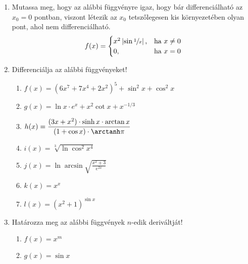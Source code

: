 \documentclass[a4paper, 12pt]{scrartcl}
\begin{document}
\begin{enumerate}
  \item Mutassa meg, hogy az alábbi függvényre igaz, hogy bár differenciálható
        az $x_0 = 0$ pontban, viszont létezik az $x_0$ tetszőlegesen kis
        környezetében olyan pont, ahol nem differenciálható.
        \[
          f(x) = \begin{cases}
            x^2 \left| \sin \sfrac1x \right|\text, & \text{ha } x \neq 0 \\
            0\text,                                & \text{ha } x = 0
          \end{cases}
        \]

  \item Differenciálja az alábbi függvényeket!
        \begin{enumerate}
          \item $\displaystyle
                  f(x) = (6x^7 + 7x^4 + 2x^2)^5 + \sin^2 x + \cos^2 x
                $

          \item $\displaystyle
                  g(x) = \ln x \cdot e^x + x^2 \cot x + x^{-1/3}
                $

          \item $\displaystyle
                  h(x) = \frac{
                    (3x + x^2) \cdot \sinh x \cdot \arctan x
                  }{
                    (1 + \cos x) \cdot \arctanh \pi
                  }
                $

          \item $\displaystyle
                  i(x) = \sqrt[3]{\ln \cos^2 x^4}
                $

          \item $\displaystyle
                  j(x) = \ln \arcsin \sqrt{\frac{x^2 + 3}{e^{2x}}}
                $

          \item $\displaystyle
                  k(x) = x^x
                $

          \item $\displaystyle
                  l(x) = (x^2 + 1)^{\sin x}
                $
        \end{enumerate}

  \item Határozza meg az alábbi függvények $n$-edik deriváltját!
        \begin{multicols}{2}
          \begin{enumerate}
            \item $f(x) = x^m$
            \item $g(x) = \sin x$
          \end{enumerate}
        \end{multicols}


\end{enumerate}
\end{document}
